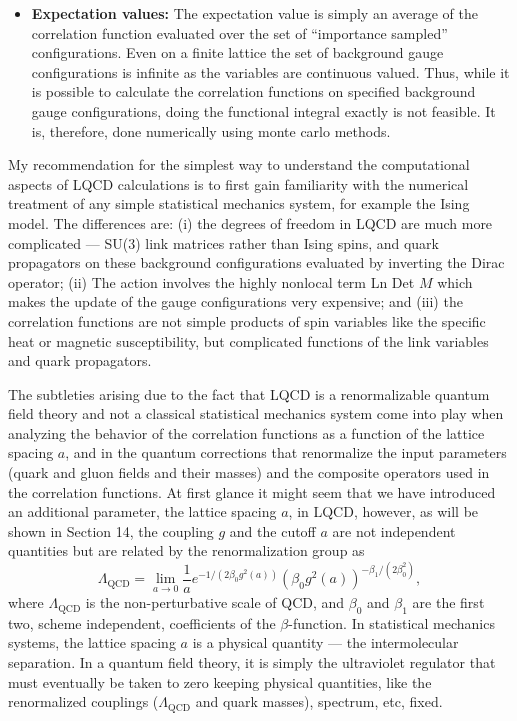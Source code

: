 \begin{itemize}
    ordered products of quark propagators and gauge fields using Wick contraction of the operator fields. There are two kinds of correlation functions that
    are calculated --- gauge invariant correlation functions as discussed above
    for the case of the pion, or those in a fixed gauge.
  \item \textbf{Expectation values:} The expectation value is simply an average of the
    correlation function evaluated over the set of ``importance sampled'' configurations. Even on a finite lattice the set of background gauge configurations is infinite as the variables are continuous valued. Thus, while it
    is possible to calculate the correlation functions on specified background
    gauge configurations, doing the functional integral exactly is not feasible.
    It is, therefore, done numerically using monte carlo methods.
\end{itemize}

My recommendation for the simplest way to understand the computational aspects of LQCD calculations is to first gain familiarity with the
numerical treatment of any simple statistical mechanics system, for example the Ising model. The differences are: (i) the degrees of freedom in
LQCD are much more complicated --- SU(3) link matrices rather than Ising
spins, and quark propagators on these background configurations evaluated
by inverting the Dirac operator; (ii) The action involves the highly nonlocal
term Ln Det $M$ which makes the update of the gauge configurations very
expensive; and (iii) the correlation functions are not simple products of spin
variables like the specific heat or magnetic susceptibility, but complicated
functions of the link variables and quark propagators.

The subtleties arising due to the fact that LQCD is a renormalizable
quantum field theory and not a classical statistical mechanics system come
into play when analyzing the behavior of the correlation functions as a
function of the lattice spacing $a$, and in the quantum corrections that renormalize the input parameters (quark and gluon fields and their masses) and
the composite operators used in the correlation functions. At first glance
it might seem that we have introduced an additional parameter, the lattice
spacing $a$, in LQCD, however, as will be shown in Section 14, the coupling
$g$ and the cutoff $a$ are not independent quantities but are related by the
renormalization group as
\begin{equation}
  \Lambda_\mathrm{QCD} = \lim_{a\to 0} \frac{1}{a} e^{-1/(2\beta_0 g^2(a))} \left( \beta_0 g^2(a) \right)^{-\beta_1/(2\beta_0^2)},
  \label{eq:lambdacd}
\end{equation}
where $\Lambda_\mathrm{QCD}$ is the non-perturbative scale of QCD, and $\beta_0$ and $\beta_1$ are the
first two, scheme independent, coefficients of the $\beta$-function. In statistical
mechanics systems, the lattice spacing $a$ is a physical quantity --- the intermolecular separation. In a quantum field theory, it is simply the ultraviolet
regulator that must eventually be taken to zero keeping physical quantities,
like the renormalized couplings ($\Lambda_\mathrm{QCD}$ and quark masses), spectrum, etc,
fixed.

